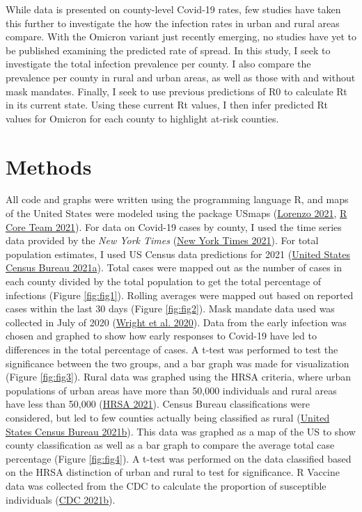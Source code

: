 \documentclass[
  12pt,
]{article}
\begin{document}
While data is presented on county-level Covid-19 rates, few studies have taken this further to investigate the how the infection rates in urban and rural areas compare. With the Omicron variant just recently emerging, no studies have yet to be published examining the predicted rate of spread. In this study, I seek to investigate the total infection prevalence per county. I also compare the prevalence per county in rural and urban areas, as well as those with and without mask mandates. Finally, I seek to use previous predictions of R0 to calculate Rt in its current state. Using these current Rt values, I then infer predicted Rt values for Omicron for each county to highlight at-risk counties.

\hypertarget{methods}{%
\section{Methods}\label{methods}}

All code and graphs were written using the programming language R, and maps of the United States were modeled using the package USmaps (\protect\hyperlink{ref-lorenzo_usmap_2021}{Lorenzo 2021}, \protect\hyperlink{ref-r_core_team_r_2021}{R Core Team 2021}). For data on Covid-19 cases by county, I used the time series data provided by the \emph{New York Times} (\protect\hyperlink{ref-new_york_times_coronavirus_2021}{New York Times 2021}). For total population estimates, I used US Census data predictions for 2021 (\protect\hyperlink{ref-united_states_census_bureau_county_2021}{United States Census Bureau 2021a}). Total cases were mapped out as the number of cases in each county divided by the total population to get the total percentage of infections (Figure \ref{fig:fig1}). Rolling averages were mapped out based on reported cases within the last 30 days (Figure \ref{fig:fig2}). Mask mandate data used was collected in July of 2020 (\protect\hyperlink{ref-wright_tracking_2020}{Wright et al. 2020}). Data from the early infection was chosen and graphed to show how early responses to Covid-19 have led to differences in the total percentage of cases. A t-test was performed to test the significance between the two groups, and a bar graph was made for visualization (Figure \ref{fig:fig3}). Rural data was graphed using the HRSA criteria, where urban populations of urban areas have more than 50,000 individuals and rural areas have less than 50,000 (\protect\hyperlink{ref-hrsa_defining_2021}{HRSA 2021}). Census Bureau classifications were considered, but led to few counties actually being classified as rural (\protect\hyperlink{ref-united_states_census_bureau_2010_2021}{United States Census Bureau 2021b}). This data was graphed as a map of the US to show county classification as well as a bar graph to compare the average total case percentage (Figure \ref{fig:fig4}). A t-test was performed on the data classified based on the HRSA distinction of urban and rural to test for significance. R Vaccine data was collected from the CDC to calculate the proportion of susceptible individuals (\protect\hyperlink{ref-cdc_covid-19_2021}{CDC 2021b}).
\end{document}

